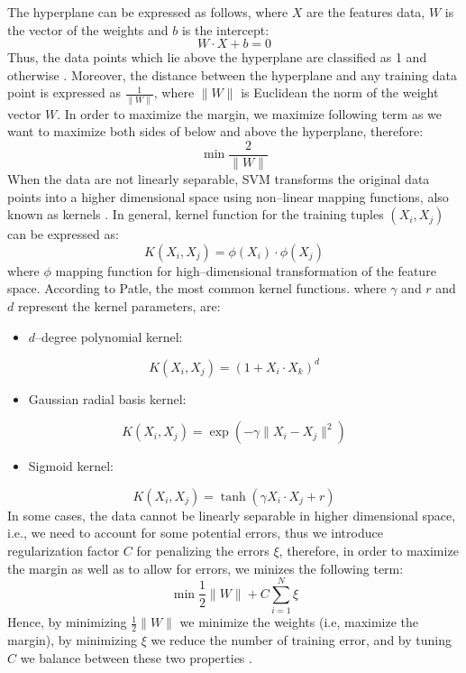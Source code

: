 The hyperplane can be expressed as follows, where $X$ are the features data, $W$ is the vector of the weights and $b$ is the intercept:
\begin{equation}\label{eq:wxdo0}
    W \cdot X + b = 0
\end{equation}
Thus, the data points which lie above the hyperplane are classified as 1 and otherwise \citep{hsu2002comparison}.
Moreover, the distance between the hyperplane and any training data point is expressed as $\frac{1}{\|W\|}$, where $\|W\|$ is Euclidean the norm of the weight vector $W$.
In order to maximize the margin, we maximize following term as we want to maximize both sides of below and above the hyperplane, therefore:
\begin{equation}
    \min {\frac{2}{\|W\|}}
\end{equation}
When the data are not linearly separable, SVM transforms the original data points into a higher dimensional space using non--linear mapping functions, also known as kernels \citep{han2011data}.
In general, kernel function for the training tuples $(X_i,X_j)$ can be expressed as:
\begin{equation}
    K(X_i,X_j) = \phi(X_i) \cdot \phi(X_j)
\end{equation}
where $\phi$ mapping function for high--dimensional transformation of the feature space. According to Patle, \citep{patle2013svm} the most common kernel functions. where $\gamma$ and $r$ and $d$ represent the kernel parameters, are:
\begin{itemize}\setlength\itemsep{0em}
    \item $d$--degree polynomial kernel:
\end{itemize}
\begin{equation}
    K\left(X_i,X_j\right) = (1+X_i \cdot X_k)^{d}
\end{equation}
\begin{itemize}\setlength\itemsep{0em}
    \item Gaussian radial basis kernel:
\end{itemize}
\begin{equation}
    K(X_i,X_j) = \exp\left(-\gamma \|X_i-X_j\|^{2}\right)
\end{equation}
\begin{itemize}\setlength\itemsep{0em}
    \item Sigmoid kernel:
\end{itemize}
\begin{equation}
    K(X_i,X_j) = \tanh(\gamma X_i \cdot X_j + r)
\end{equation}
In some cases, the data cannot be linearly separable in higher dimensional space, i.e., we need to account for some potential errors, thus we introduce regularization factor $C$  for penalizing the errors $\xi$, therefore, in order to maximize the margin as well as to allow for errors, we minizes the following term:
\begin{equation}
    \min \frac{1}{2} \|W\| + C \sum_{i=1}^{N} \xi
\end{equation}
Hence, by minimizing $\frac{1}{2} \|W\|$ we minimize the weights (i.e, maximize the margin), by minimizing $\xi$ we reduce the number of training error, and by tuning $C$ we balance between these two properties \citep{hsu2002comparison}. 


